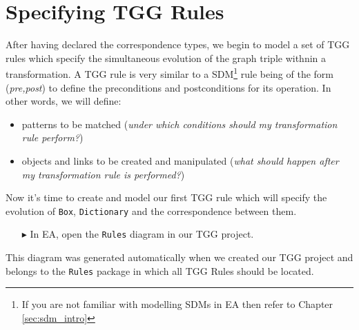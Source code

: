 \section{Specifying TGG Rules}

After having declared the correspondence types, we begin to model a set of TGG rules which specify the simultaneous evolution of the graph triple withnin a transformation. 
A TGG rule is very similar to a SDM\footnote{If you are not familiar with modelling SDMs in EA then refer to Chapter \ref{sec:sdm_intro}} rule being of the form
(\emph{pre,post}) to define the preconditions and postconditions for its operation.
In other words, we will define:

\begin{itemize}
  \item patterns to be matched (\emph{under which conditions should my transformation rule perform?})
  \item objects and links to be created and manipulated (\emph{what should happen after my transformation rule is performed?}) 
\end{itemize}

Now it's time to create and model our first TGG rule which will specify the evolution of \texttt{Box}, \texttt{Dictionary}  and the correspondence between them.

\begin{enumerate}
\item[$\blacktriangleright$] In EA, open the \texttt{Rules} diagram in our TGG project.
\end{enumerate}

This diagram was generated automatically when we created our TGG project and belongs to the \texttt{Rules} package in which all TGG Rules should be located.


